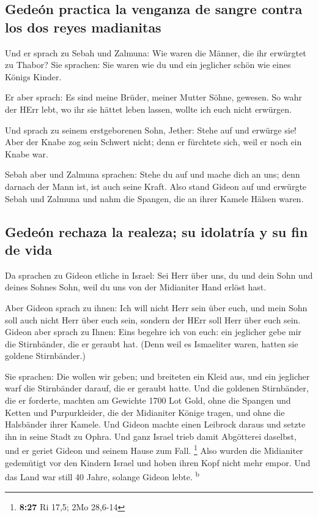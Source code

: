 \hypertarget{gedeuxf3n-practica-la-venganza-de-sangre-contra-los-dos-reyes-madianitas}{%
\subsection{Gedeón practica la venganza de sangre contra los dos reyes
madianitas}\label{gedeuxf3n-practica-la-venganza-de-sangre-contra-los-dos-reyes-madianitas}}

 Und er sprach zu Sebah und Zalmuna: Wie waren die
Männer, die ihr erwürgtet zu Thabor? Sie sprachen: Sie waren wie du und
ein jeglicher schön wie eines Königs Kinder.

 Er aber sprach: Es sind meine Brüder, meiner Mutter
Söhne, gewesen. So wahr der HErr lebt, wo ihr sie hättet leben lassen,
wollte ich euch nicht erwürgen.

 Und sprach zu seinem erstgeborenen Sohn, Jether: Stehe
auf und erwürge sie! Aber der Knabe zog sein Schwert nicht; denn er
fürchtete sich, weil er noch ein Knabe war.

 Sebah aber und Zalmuna sprachen: Stehe du auf und mache
dich an uns; denn darnach der Mann ist, ist auch seine Kraft. Also stand
Gideon auf und erwürgte Sebah und Zalmuna und nahm die Spangen, die an
ihrer Kamele Hälsen waren.

\hypertarget{gedeuxf3n-rechaza-la-realeza-su-idolatruxeda-y-su-fin-de-vida}{%
\subsection{Gedeón rechaza la realeza; su idolatría y su fin de
vida}\label{gedeuxf3n-rechaza-la-realeza-su-idolatruxeda-y-su-fin-de-vida}}

 Da sprachen zu Gideon etliche in Israel: Sei Herr über
uns, du und dein Sohn und deines Sohnes Sohn, weil du uns von der
Midianiter Hand erlöst hast.

 Aber Gideon sprach zu ihnen: Ich will nicht Herr sein
über euch, und mein Sohn soll auch nicht Herr über euch sein, sondern
der HErr soll Herr über euch sein.  Gideon aber sprach zu
Ihnen: Eins begehre ich von euch: ein jeglicher gebe mir die
Stirnbänder, die er geraubt hat. (Denn weil es Ismaeliter waren, hatten
sie goldene Stirnbänder.)

 Sie sprachen: Die wollen wir geben; und breiteten ein
Kleid aus, und ein jeglicher warf die Stirnbänder darauf, die er geraubt
hatte.  Und die goldenen Stirnbänder, die er forderte,
machten am Gewichte 1700 Lot Gold, ohne die Spangen und Ketten und
Purpurkleider, die der Midianiter Könige tragen, und ohne die Halsbänder
ihrer Kamele.  Und Gideon machte einen Leibrock daraus
und setzte ihn in seine Stadt zu Ophra. Und ganz Israel trieb damit
Abgötterei daselbst, und er geriet Gideon und seinem Hause zum Fall.
\footnote{\textbf{8:27} Ri 17,5; 2Mo 28,6-14}  Also
wurden die Midianiter gedemütigt vor den Kindern Israel und hoben ihren
Kopf nicht mehr empor. Und das Land war still 40 Jahre, solange Gideon
lebte. \textsuperscript{b}

